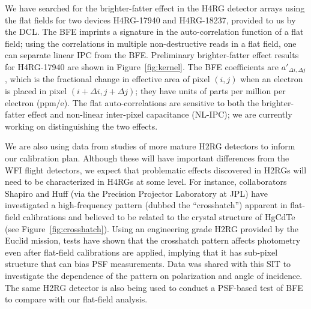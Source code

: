 We have searched for the brighter-fatter effect in the H4RG detector arrays
using the flat fields for two devices H4RG-17940 and H4RG-18237, provided to us
by the DCL. The BFE imprints a signature in the auto-correlation function of a
flat field; using the correlations in multiple non-destructive reads in a flat
field, one can separate linear IPC from the BFE. Preliminary brighter-fatter
effect results for H4RG-17940 are shown in Figure~\ref{fig:kernel}. The BFE
coefficients are $a'_{\Delta i,\Delta j}$, which is the fractional change in
effective area of pixel $(i,j)$ when an electron is placed in pixel $(i+\Delta
i, j+\Delta j)$; they have units of parts per million per electron (ppm/e). The
flat auto-correlations are sensitive to both the brighter-fatter effect and
non-linear inter-pixel capacitance (NL-IPC); we are currently working on
distinguishing the two effects.

We are also using data from studies of more mature H2RG detectors to inform our
calibration plan.  Although these will have important differences from the WFI
flight detectors, we expect that problematic effects discovered in H2RGs will
need to be characterized in H4RGs at some level.  For instance, collaborators
Shapiro and Huff (via the Precision Projector Laboratory at JPL) have
investigated a high-frequency pattern (dubbed the ``crosshatch'') apparent in
flat-field calibrations and believed to be related to the crystal structure of
HgCdTe (see Figure~\ref{fig:crosshatch}).  Using an engineering grade H2RG
provided by the Euclid mission, tests have shown that the crosshatch pattern
affects photometry even after flat-field calibrations are applied, implying that
it has sub-pixel structure that can bias PSF measurements.  Data was shared with
this SIT to investigate the dependence of the pattern on polarization and angle
of incidence.  The same H2RG detector is also being used to conduct a PSF-based
test of BFE to compare with our flat-field analysis.


